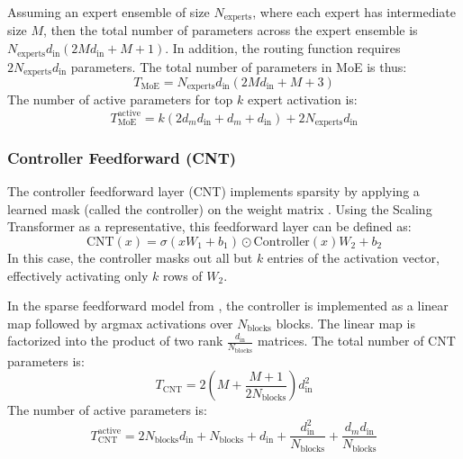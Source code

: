Assuming an expert ensemble of size $N_\text{experts}$, where each expert has intermediate size $M$, then the total number of parameters across the expert ensemble is $N_\text{experts}d_\text{in}(2Md_\text{in} + M+1)$. In addition, the routing function requires $2N_\text{experts}d_\text{in}$ parameters. The total number of parameters in MoE is thus: 
\begin{equation}
    T_\text{MoE} = N_\text{experts}d_\text{in}(2Md_\text{in} + M + 3)
\end{equation}
The number of active parameters for top $k$ expert activation is:
\begin{equation}
    T_\text{MoE}^\text{active} = k(2d_md_\text{in} + d_m + d_\text{in}) + 2N_\text{experts}d_\text{in}
\end{equation}

\subsubsection{Controller Feedforward (CNT)}
The controller feedforward layer (CNT) implements sparsity by applying a learned mask (called the controller) on the weight matrix \cite{jaszczur_sparse_2021,gorbett_sparse_2023,thangarasa_mediswift_2024}. Using the Scaling Transformer \cite{jaszczur_sparse_2021} as a representative, this feedforward layer can be defined as:
\begin{equation}
    \label{eq:cnt}
    \text{CNT}(x) = \sigma(xW_1+b_1) \odot \text{Controller}(x) W_2 +b_2
\end{equation}
In this case, the controller masks out all but $k$ entries of the activation vector, effectively activating only $k$ rows of $W_2$.

In the sparse feedforward model from \cite{jaszczur_sparse_2021}, the controller is implemented as a linear map followed by argmax activations over $N_\text{blocks}$ blocks. The linear map is factorized into the product of two rank $\frac{d_\text{in}}{N_\text{blocks}}$ matrices. The total number of CNT parameters is: \begin{equation}
    T_\text{CNT} = 2(M+\frac{M + 1}{2N_\text{blocks}})d_\text{in}^2
\end{equation}
The number of active parameters is: \begin{equation}
    T_\text{CNT}^\text{active} =  2N_\text{blocks}d_\text{in} + N_\text{blocks} + d_\text{in} + \frac{d_\text{in}^2}{N_\text{blocks}} + \frac{d_md_\text{in}}{N_\text{blocks}}
\end{equation}


